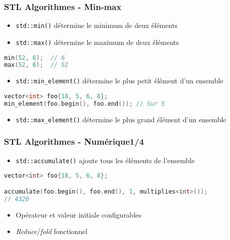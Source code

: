 \documentclass[C++.tex]{subfiles}
\begin{document}
\begin{frame}[fragile]
	\frametitle{STL Algorithmes - Min-max}


	\begin{itemize}
		\item \lstinline|std::min()| détermine le minimum de deux éléments
		\item \lstinline|std::max()| détermine le maximum de deux éléments
	\end{itemize}

	\begin{lstlisting}[language=C++]
min(52, 6);  // 6
max(52, 6);  // 52\end{lstlisting}

	\begin{itemize}
		\item \lstinline|std::min_element()| détermine le plus petit élément d'un ensemble
	\end{itemize}

	\begin{lstlisting}[language=C++]
vector<int> foo{18, 5, 6, 8};
min_element(foo.begin(), foo.end()); // Sur 5 \end{lstlisting}

	\begin{itemize}
		\item \lstinline|std::max_element()| détermine le plus grand élément d'un ensemble
	\end{itemize}
\end{frame}

\begin{frame}[fragile]
	\frametitle{STL Algorithmes - Numérique\titlehfill{}1/4}
	\begin{itemize}
		\item \lstinline|std::accumulate()| \og ajoute\fg{} tous les éléments de l'ensemble
	\end{itemize}

	\begin{lstlisting}[language=C++]
vector<int> foo{18, 5, 6, 8};

accumulate(foo.begin(), foo.end(), 1, multiplies<int>());
// 4320 \end{lstlisting}

	\begin{itemize}
		\item Opérateur et valeur initiale configurables
		\item \textit{Reduce}/\textit{fold} fonctionnel
	\end{itemize}
\end{frame}
\end{document}
